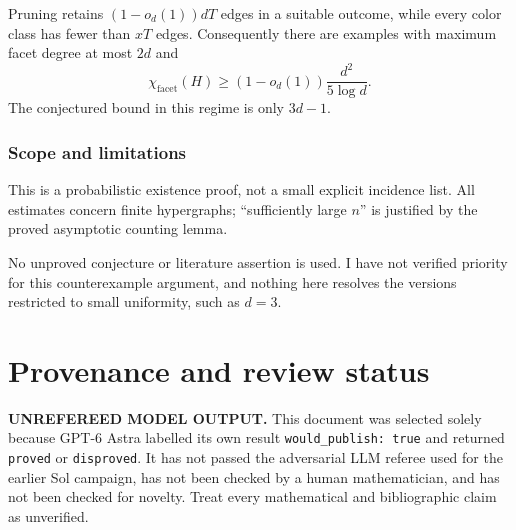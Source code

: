 \documentclass[
  11pt,
  a4paper,
]{article}
\begin{document}
Pruning retains \((1-o_d(1))dT\) edges in a suitable outcome, while
every color class has fewer than \(xT\) edges. Consequently there are
examples with maximum facet degree at most \(2d\) and \[
\chi_{\mathrm{facet}}(H)
\ge
(1-o_d(1))\frac{d^2}{5\log d}.
\] The conjectured bound in this regime is only \(3d-1\).

\subsubsection{Scope and limitations}\label{scope-and-limitations}

This is a probabilistic existence proof, not a small explicit incidence
list. All estimates concern finite hypergraphs; ``sufficiently large
\(n\)'' is justified by the proved asymptotic counting lemma.

No unproved conjecture or literature assertion is used. I have not
verified priority for this counterexample argument, and nothing here
resolves the versions restricted to small uniformity, such as \(d=3\).

\appendix

\section{Provenance and review
status}\label{provenance-and-review-status}

\begin{warning}

\textbf{UNREFEREED MODEL OUTPUT.} This document was selected solely
because GPT-6 Astra labelled its own result
\texttt{would\_publish:\ true} and returned \texttt{proved} or
\texttt{disproved}. It has not passed the adversarial LLM referee used
for the earlier Sol campaign, has not been checked by a human
mathematician, and has not been checked for novelty. Treat every
mathematical and bibliographic claim as unverified.

\end{warning}
\end{document}
